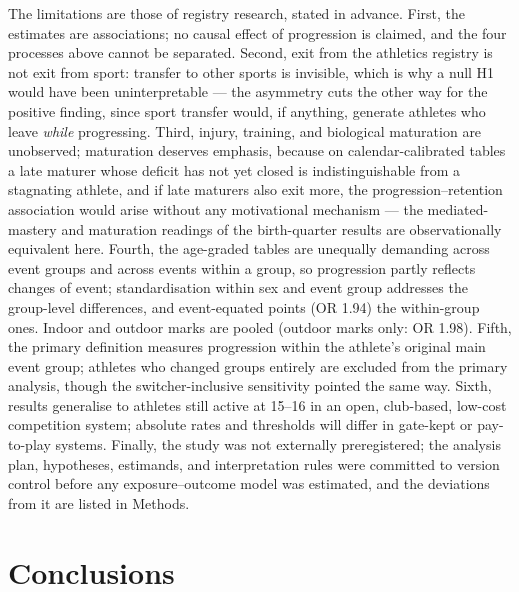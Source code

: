 \documentclass[12pt,a4paper]{article}
\begin{document}
The limitations are those of registry research, stated in advance. First, the estimates are associations; no causal effect of progression is claimed, and the four processes above cannot be separated. Second, exit from the athletics registry is not exit from sport: transfer to other sports is invisible, which is why a null H1 would have been uninterpretable --- the asymmetry cuts the other way for the positive finding, since sport transfer would, if anything, generate athletes who leave \emph{while} progressing. Third, injury, training, and biological maturation are unobserved; maturation deserves emphasis, because on calendar-calibrated tables a late maturer whose deficit has not yet closed is indistinguishable from a stagnating athlete, and if late maturers also exit more, the progression--retention association would arise without any motivational mechanism --- the mediated-mastery and maturation readings of the birth-quarter results are observationally equivalent here. Fourth, the age-graded tables are unequally demanding across event groups and across events within a group, so progression partly reflects changes of event; standardisation within sex and event group addresses the group-level differences, and event-equated points (OR 1.94) the within-group ones. Indoor and outdoor marks are pooled (outdoor marks only: OR 1.98). Fifth, the primary definition measures progression within the athlete's original main event group; athletes who changed groups entirely are excluded from the primary analysis, though the switcher-inclusive sensitivity pointed the same way. Sixth, results generalise to athletes still active at 15--16 in an open, club-based, low-cost competition system; absolute rates and thresholds will differ in gate-kept or pay-to-play systems. Finally, the study was not externally preregistered; the analysis plan, hypotheses, estimands, and interpretation rules were committed to version control before any exposure--outcome model was estimated, and the deviations from it are listed in Methods.

\section{Conclusions}
\end{document}
